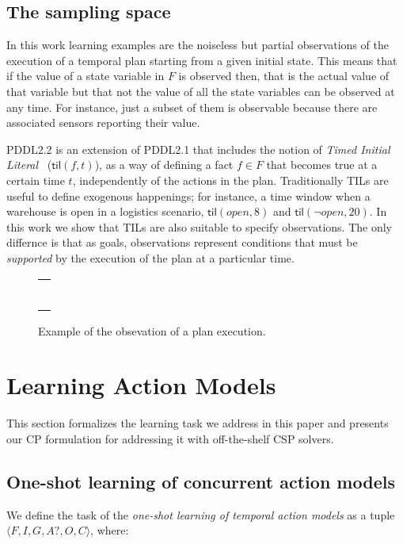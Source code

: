 \documentclass{ecai}
\newcommand{\tup}[1]{{\langle #1 \rangle}}
\newcommand{\til}{\mathsf{til}}    %
\begin{document}
\subsection{The sampling space}
\label{sec:sampling-space}
In this work learning examples are the noiseless but partial observations of the execution of a temporal plan starting from a given initial state. This means that if the value of a state variable in $F$ is observed then, that is the actual value of that variable but that not the value of all the state variables can be observed at any time. For instance, just a subset of them is observable because there are associated sensors reporting their value.

PDDL2.2 is an extension of PDDL2.1 that includes the notion of {\em Timed Initial Literal}~\cite{hoffmann2005} ($\til(f,t)$), as a way of defining a fact $f\in F$ that becomes true at a certain time $t$, independently of the actions in the plan. Traditionally TILs are useful to define exogenous happenings; for instance, a time window when a warehouse is open in a logistics scenario, $\til(open,8)$ and $\til(\neg open,20)$. In this work we show that TILs are also suitable to specify observations. The only differnce is that as goals, observations represent conditions that must be {\em supported} by the execution of the plan at a particular time.

\begin{figure}
  \begin{tabular}{p{\textwidth}}
\begin{tiny}    
\begin{verbatim}

\end{verbatim}
\end{tiny}    
\end{tabular}
\caption{\small Example of the obsevation of a plan execution.}
\label{fig:exampletils}
\end{figure}



\section{Learning Action Models}
This section formalizes the learning task we address in this paper and presents our CP formulation for addressing it with off-the-shelf CSP solvers.

\subsection{One-shot learning of concurrent action models}
We define the task of the {\em one-shot learning of temporal action models} as a tuple $\tup{F,I,G,A?,O,C}$, where:
\end{document}
